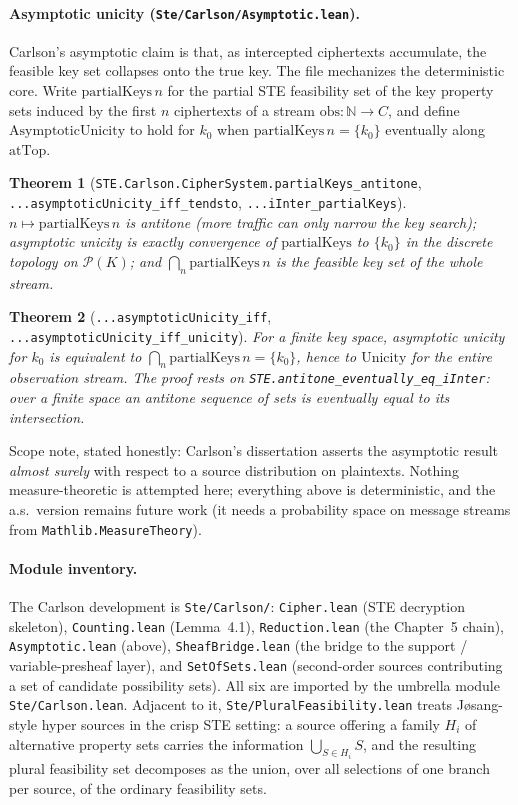 \documentclass[11pt]{article}
\newtheorem{theorem}{Theorem}
\begin{document}
\paragraph{Asymptotic unicity (\texttt{Ste/Carlson/Asymptotic.lean}).}
Carlson's asymptotic claim is that, as intercepted ciphertexts
accumulate, the feasible key set collapses onto the true key. The file
mechanizes the deterministic core. Write
$\mathrm{partialKeys}\,n$ for the partial STE feasibility set of the key
property sets induced by the first $n$ ciphertexts of a stream
$\mathrm{obs}:\mathbb N\to C$, and define
$\mathrm{AsymptoticUnicity}$ to hold for $k_0$ when
$\mathrm{partialKeys}\,n=\{k_0\}$ eventually along
$\mathrm{atTop}$.
\begin{theorem}[\texttt{STE.Carlson.CipherSystem.partialKeys\_antitone},
\texttt{...asymptoticUnicity\_iff\_tendsto},
\texttt{...iInter\_partialKeys}]
$n\mapsto\mathrm{partialKeys}\,n$ is antitone (more traffic can only
narrow the key search); asymptotic unicity is exactly convergence of
$\mathrm{partialKeys}$ to $\{k_0\}$ in the discrete topology on
$\mathcal P(K)$; and $\bigcap_n \mathrm{partialKeys}\,n$ is the feasible
key set of the whole stream.
\end{theorem}
\begin{theorem}[\texttt{...asymptoticUnicity\_iff},
\texttt{...asymptoticUnicity\_iff\_unicity}]
For a finite key space, asymptotic unicity for $k_0$ is equivalent to
$\bigcap_n\mathrm{partialKeys}\,n=\{k_0\}$, hence to
$\mathrm{Unicity}$ for the entire observation stream. The proof rests on
\texttt{STE.antitone\_eventually\_eq\_iInter}: over a finite space an
antitone sequence of sets is eventually equal to its intersection.
\end{theorem}
\noindent Scope note, stated honestly: Carlson's dissertation asserts the
asymptotic result \emph{almost surely} with respect to a source
distribution on plaintexts. Nothing measure-theoretic is attempted here;
everything above is deterministic, and the a.s.\ version remains future
work (it needs a probability space on message streams from
\texttt{Mathlib.MeasureTheory}).

\paragraph{Module inventory.}
The Carlson development is \texttt{Ste/Carlson/}:
\texttt{Cipher.lean} (STE decryption skeleton),
\texttt{Counting.lean} (Lemma~4.1),
\texttt{Reduction.lean} (the Chapter~5 chain),
\texttt{Asymptotic.lean} (above),
\texttt{SheafBridge.lean} (the bridge to the support / variable-presheaf
layer), and \texttt{SetOfSets.lean} (second-order sources contributing a
set of candidate possibility sets). All six are imported by the umbrella
module \texttt{Ste/Carlson.lean}. Adjacent to it,
\texttt{Ste/PluralFeasibility.lean} treats J\o sang-style hyper sources
in the crisp STE setting: a source offering a family $H_i$ of
alternative property sets carries the information $\bigcup_{S\in H_i}S$,
and the resulting plural feasibility set decomposes as the union, over
all selections of one branch per source, of the ordinary feasibility
sets.
\end{document}
